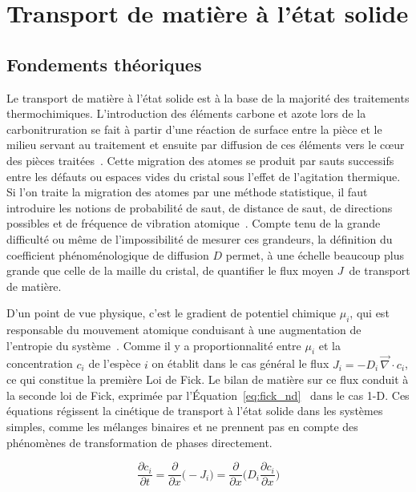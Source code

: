 \section{Transport de matière à l'état solide}
\label{sec:diffusion}

\subsection{Fondements théoriques}

Le transport de matière à l'état solide est à la base de la majorité des traitements thermochimiques. L'introduction des éléments carbone et azote lors de la carbonitruration se fait à partir d'une réaction de surface entre la pièce et le milieu servant au traitement et ensuite par diffusion de ces éléments vers le c{\oe}ur des pièces traitées~\cite{Slycke1981i}.  Cette migration des atomes se produit par sauts successifs entre les défauts ou espaces vides du cristal sous l'effet de l'agitation thermique.  Si l'on traite la migration des atomes par une méthode statistique, il faut introduire les notions de probabilité de saut, de distance de saut, de directions possibles et de fréquence de vibration atomique~\cite{Jaoul2004}.  Compte tenu de la grande difficulté ou même de l'impossibilité de mesurer ces grandeurs, la définition du coefficient phénoménologique de diffusion $D$ permet, à une échelle beaucoup plus grande que celle de la maille du cristal, de quantifier le flux moyen $J$ de transport de matière.

D'un point de vue physique, c'est le gradient de potentiel chimique $\mu_{i}$, qui est responsable du mouvement atomique conduisant à une augmentation de l'entropie du système~\cite{Guiraldenq1994,Jaoul2004}. Comme il y a proportionnalité entre $\mu_{i}$ et la concentration $c_{i}$ de l'espèce $i$ on établit dans le cas général le flux $J_{i}=-D_{i}\,\vec{\nabla}\cdot{}c_{i}$, ce qui constitue la première Loi de Fick. Le bilan de matière sur ce flux conduit à la seconde loi de Fick, exprimée par l'Équation~\ref{eq:fick_nd}~\cite{Borgenstam2000} dans le cas 1-D. Ces équations régissent la cinétique de transport à l'état solide dans les systèmes simples, comme les mélanges binaires et ne prennent pas en compte des phénomènes de transformation de phases directement.

\begin{equation}
  \frac{\partial c_{i}}{\partial t}=
  \frac{\partial}{\partial x}\biggr(-J_{i}\biggr)=
  \frac{\partial}{\partial x}\biggr(D_{i}\frac{\partial c_{i}}{\partial x}\biggr)
  \label{eq:fick_nd}
\end{equation}

